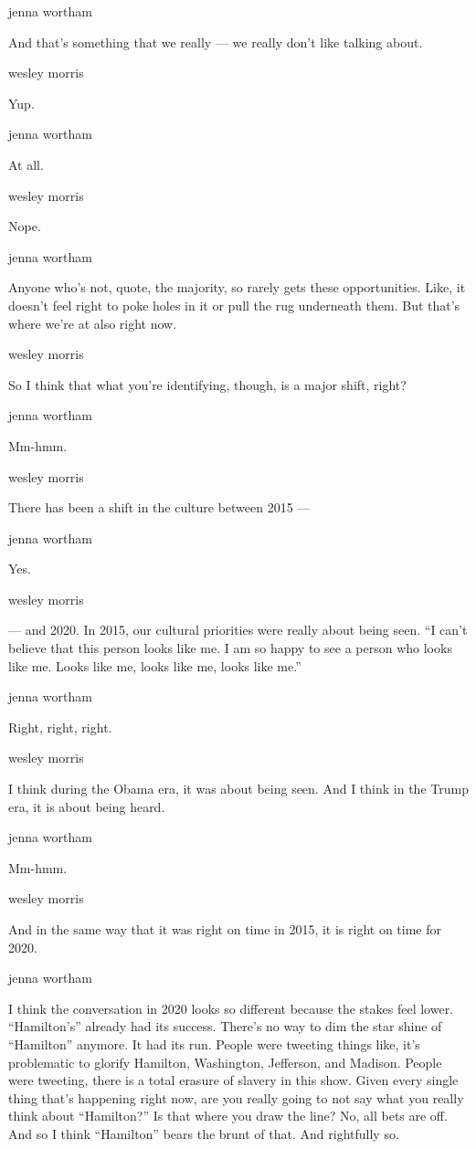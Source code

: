 jenna wortham

And that's something that we really --- we really don't like talking
about.

wesley morris

Yup.

jenna wortham

At all.

wesley morris

Nope.

jenna wortham

Anyone who's not, quote, the majority, so rarely gets these
opportunities. Like, it doesn't feel right to poke holes in it or pull
the rug underneath them. But that's where we're at also right now.

wesley morris

So I think that what you're identifying, though, is a major shift,
right?

jenna wortham

Mm-hmm.

wesley morris

There has been a shift in the culture between 2015 ---

jenna wortham

Yes.

wesley morris

--- and 2020. In 2015, our cultural priorities were really about being
seen. ``I can't believe that this person looks like me. I am so happy to
see a person who looks like me. Looks like me, looks like me, looks like
me.''

jenna wortham

Right, right, right.

wesley morris

I think during the Obama era, it was about being seen. And I think in
the Trump era, it is about being heard.

jenna wortham

Mm-hmm.

wesley morris

And in the same way that it was right on time in 2015, it is right on
time for 2020.

jenna wortham

I think the conversation in 2020 looks so different because the stakes
feel lower. ``Hamilton's'' already had its success. There's no way to
dim the star shine of ``Hamilton'' anymore. It had its run. People were
tweeting things like, it's problematic to glorify Hamilton, Washington,
Jefferson, and Madison. People were tweeting, there is a total erasure
of slavery in this show. Given every single thing that's happening right
now, are you really going to not say what you really think about
``Hamilton?'' Is that where you draw the line? No, all bets are off. And
so I think ``Hamilton'' bears the brunt of that. And rightfully so.

